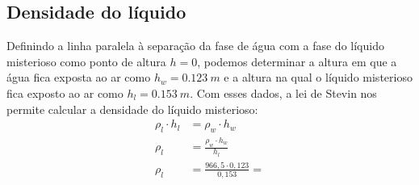 \subsection{Densidade do líquido}
Definindo a linha paralela à separação da fase de água com a fase do líquido misterioso como ponto de altura \(h = 0\), podemos determinar a altura em que a água fica exposta ao ar como \(h_w = \qty{0,123}{m}\) e a altura na qual o líquido misterioso fica exposto ao ar como \(h_l = \qty{0,153}{m}\). Com esses dados, a lei de Stevin nos permite calcular a densidade do líquido misterioso:
\begin{align*}
    \rho_l \cdot h_l &= \rho_w \cdot h_w\\
    \rho_l &= \frac{\rho_w \cdot h_w}{h_l}\\
    \rho_l &= \frac{966,5 \cdot 0,123}{0,153} =  
\end{align*}
